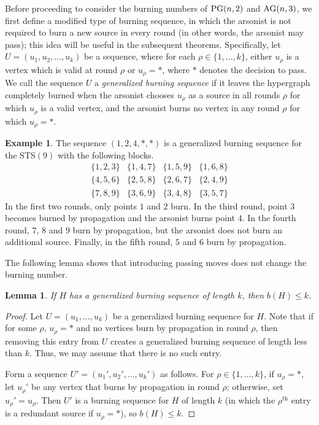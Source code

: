 \documentclass[12pt]{article}
\DeclareMathOperator{\PG}{\rm PG}
\DeclareMathOperator{\AG}{\rm AG}
\newtheorem{lemma}[theorem]{Lemma}
\theoremstyle{definition}
\newtheorem{example}[theorem]{Example}
\numberwithin{table}{section}
\begin{document}
Before proceeding to consider the burning numbers of $\PG(n,2)$ and $\AG(n,3)$, we first define a modified type of burning sequence, in which the arsonist is not required to burn a new source in every round (in other words, the arsonist may pass); this idea will be useful in the subsequent theorems.  Specifically, let $U=(u_1, u_2, \ldots, u_k)$ be a sequence, where for each $\rho \in \{1, \ldots, k\}$, either $u_{\rho}$ is a vertex which is valid at round $\rho$ or $u_{\rho} = *$, where $*$ denotes the decision to pass.  We call the sequence $U$ a {\em generalized burning sequence}
if it leaves the hypergraph completely burned when the arsonist chooses $u_{\rho}$ as a source in all rounds $\rho$ for which $u_{\rho}$ is a valid vertex, and the arsonist burns no vertex in any round $\rho$ for which $u_{\rho}=*$.  

\begin{example} \label{GenBurnSeq-STS(9)}
The sequence $(1,2,4,*,*)$ is a generalized burning sequence for the STS$(9)$ with the following blocks.
\[
\begin{array}{llll}
\{1,2,3\} & \{1,4,7\} & \{1,5,9\} & \{1,6,8\} \\
\{4,5,6\} & \{2,5,8\} & \{2,6,7\} & \{2,4,9\} \\
\{7,8,9\} & \{3,6,9\} & \{3,4,8\} & \{3,5,7\} 
\end{array}
\]
In the first two rounds, only points $1$ and $2$ burn.  In the third round, point $3$ becomes burned by propagation and the arsonist burns point $4$.  In the fourth round, $7$, $8$ and $9$ burn by propagation, but the arsonist does not burn an additional source.  Finally, in the fifth round, $5$ and $6$ burn by propagation.  
\end{example}

The following lemma shows that introducing passing moves does not change the burning number.

\begin{lemma} \label{generalized burning sequence}
If $H$ has a generalized burning sequence of length $k$, then $b(H) \leq k$.
\end{lemma}

\begin{proof}
Let $U=(u_1, \ldots, u_k)$ be a generalized burning sequence for $H$.  Note that if for some $\rho$, $u_{\rho}=*$ and no vertices burn by propagation in round $\rho$, then removing this entry from $U$ creates a generalized burning sequence of length less than $k$.  Thus, we may assume that there is no such entry. 

Form a sequence $U'=(u_1',u_2',\ldots,u_k')$ as follows.  For $\rho \in \{1,\ldots,k\}$, if $u_{\rho}=*$, let $u_{\rho}'$ be any vertex that burns by propagation in round $\rho$; otherwise, set $u_{\rho}'=u_{\rho}$.  Then $U'$ is a burning sequence for $H$ of length $k$ (in which the $\rho^{\mathrm{th}}$ entry is a redundant source if $u_{\rho}=*$), so $b(H) \leq k$.
\end{proof}
\end{document}
